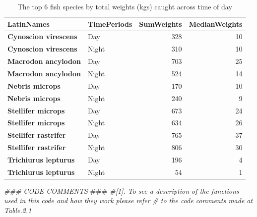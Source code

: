 \documentclass[
]{book}
\newenvironment{Shaded}{\begin{snugshade}}{\end{snugshade}}
\newcommand{\AlertTok}[1]{\textcolor[rgb]{0.94,0.16,0.16}{#1}}
\newcommand{\CommentTok}[1]{\textcolor[rgb]{0.56,0.35,0.01}{\textit{#1}}}
\begin{document}
\begin{table}

\caption{\label{tab:unnamed-chunk-14}The top 6 fish species by total weights (kgs) caught across time of day}
\centering
\begin{tabular}[t]{>{}l|l|r|r}
\hline
\textbf{LatinNames} & \textbf{TimePeriods} & \textbf{SumWeights} & \textbf{MedianWeights}\\
\hline
\textbf{Cynoscion virescens} & Day & 328 & 10\\
\hline
\textbf{Cynoscion virescens} & Night & 310 & 10\\
\hline
\textbf{Macrodon ancylodon} & Day & 703 & 25\\
\hline
\textbf{Macrodon ancylodon} & Night & 524 & 14\\
\hline
\textbf{Nebris microps} & Day & 170 & 10\\
\hline
\textbf{Nebris microps} & Night & 240 & 9\\
\hline
\textbf{Stellifer microps} & Day & 673 & 24\\
\hline
\textbf{Stellifer microps} & Night & 634 & 26\\
\hline
\textbf{Stellifer rastrifer} & Day & 765 & 37\\
\hline
\textbf{Stellifer rastrifer} & Night & 806 & 30\\
\hline
\textbf{Trichiurus lepturus} & Day & 196 & 4\\
\hline
\textbf{Trichiurus lepturus} & Night & 54 & 1\\
\hline
\end{tabular}
\end{table}

\begin{Shaded}
\begin{Highlighting}[]
\CommentTok{### CODE COMMENTS }\AlertTok{###}
\CommentTok{#[1]. To see a description of the functions used in this code and how they work please refer }
\CommentTok{#     to the code comments made at Table.2.1}
\end{Highlighting}
\end{Shaded}
\end{document}
